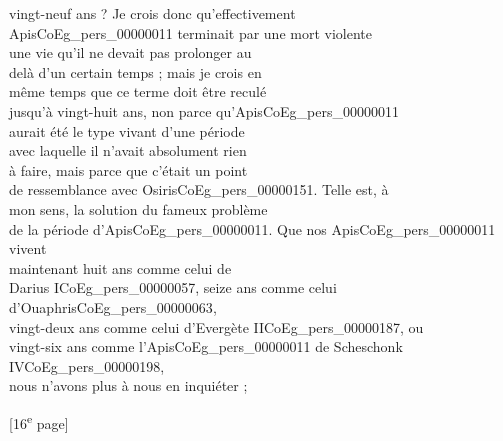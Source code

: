 \documentclass{book}
\begin{document}
{\begin{paracol}{2}
vingt-neuf ans ? Je crois donc qu’effectivement\\
Apis\gls{CoEg_pers_00000011} terminait par une mort violente\\
une vie qu’il ne devait pas prolonger au\\
delà d’un certain temps ; mais je crois en\\
même temps que ce terme doit être reculé\\
jusqu’à vingt-huit ans, non parce qu’Apis\gls{CoEg_pers_00000011}\\
aurait été le type vivant d’une période\\
avec laquelle il n’avait absolument rien\\
à faire, mais parce que c’était un point\\
de ressemblance avec Osiris\gls{CoEg_pers_00000151}. Telle est, à\\
mon sens, la solution du fameux problème\\
de la période d’Apis\gls{CoEg_pers_00000011}. Que nos Apis\gls{CoEg_pers_00000011} vivent\\
maintenant huit ans comme celui de\\
Darius I\gls{CoEg_pers_00000057}, seize ans comme celui d’Ouaphris\gls{CoEg_pers_00000063},\\
vingt-deux ans comme celui d’Evergète II\gls{CoEg_pers_00000187}, ou\\
vingt-six ans comme l’Apis\gls{CoEg_pers_00000011} de Scheschonk IV\gls{CoEg_pers_00000198},\\
nous n’avons plus à nous en inquiéter ;
\end{paracol}

{\footnotesize\begin{center} {[16\textsuperscript{e} page]}\end{center}}

}
\end{document}
